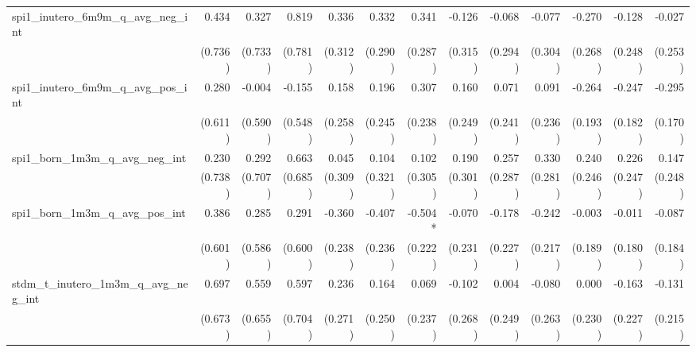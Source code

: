 \begin{tabular}{lrrrrrrrrrrrr}
spi1\_inutero\_6m9m\_q\_avg\_neg\_int       &        0.434 &        0.327 &        0.819 &        0.336 &        0.332 &        0.341 &       -0.126 &       -0.068 &       -0.077 &       -0.270 &       -0.128 &       -0.027 \\ 
                                            &      (0.736) &      (0.733) &      (0.781) &      (0.312) &      (0.290) &      (0.287) &      (0.315) &      (0.294) &      (0.304) &      (0.268) &      (0.248) &      (0.253) \\ 
spi1\_inutero\_6m9m\_q\_avg\_pos\_int       &        0.280 &       -0.004 &       -0.155 &        0.158 &        0.196 &        0.307 &        0.160 &        0.071 &        0.091 &       -0.264 &       -0.247 &       -0.295 \\ 
                                            &      (0.611) &      (0.590) &      (0.548) &      (0.258) &      (0.245) &      (0.238) &      (0.249) &      (0.241) &      (0.236) &      (0.193) &      (0.182) &      (0.170) \\ 
spi1\_born\_1m3m\_q\_avg\_neg\_int          &        0.230 &        0.292 &        0.663 &        0.045 &        0.104 &        0.102 &        0.190 &        0.257 &        0.330 &        0.240 &        0.226 &        0.147 \\ 
                                            &      (0.738) &      (0.707) &      (0.685) &      (0.309) &      (0.321) &      (0.305) &      (0.301) &      (0.287) &      (0.281) &      (0.246) &      (0.247) &      (0.248) \\ 
spi1\_born\_1m3m\_q\_avg\_pos\_int          &        0.386 &        0.285 &        0.291 &       -0.360 &       -0.407 &      -0.504* &       -0.070 &       -0.178 &       -0.242 &       -0.003 &       -0.011 &       -0.087 \\ 
                                            &      (0.601) &      (0.586) &      (0.600) &      (0.238) &      (0.236) &      (0.222) &      (0.231) &      (0.227) &      (0.217) &      (0.189) &      (0.180) &      (0.184) \\ 
stdm\_t\_inutero\_1m3m\_q\_avg\_neg\_int    &        0.697 &        0.559 &        0.597 &        0.236 &        0.164 &        0.069 &       -0.102 &        0.004 &       -0.080 &        0.000 &       -0.163 &       -0.131 \\ 
                                            &      (0.673) &      (0.655) &      (0.704) &      (0.271) &      (0.250) &      (0.237) &      (0.268) &      (0.249) &      (0.263) &      (0.230) &      (0.227) &      (0.215) \\ 

\end{tabular}
